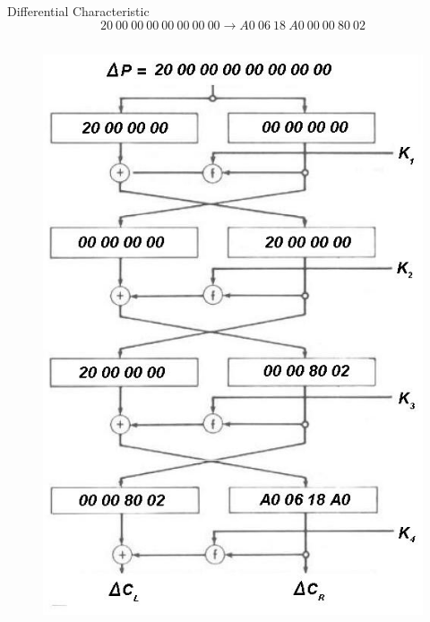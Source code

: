 \documentclass[9pt]{beamer}
\begin{document}
\begin{frame}
\begin{columns}
\begin{column}{0.6\textwidth}
\vspace{5mm}
\pause Differential Characteristic
\[ 20\:00\:00\:00\:00\:00\:00\:00 \rightarrow A0\:06\:18\:A0\:00\:00\:80\:02 \]

\end{column}
\end{columns}
\end{frame}

\begin{frame}
\begin{columns}
\begin{column}{0.4\textwidth}
\begin{figure}
\includegraphics[totalheight=0.8\textheight]{des_diff_char.jpg}
\end{figure}
\end{column}


\end{columns}
\end{frame}
\end{document}
